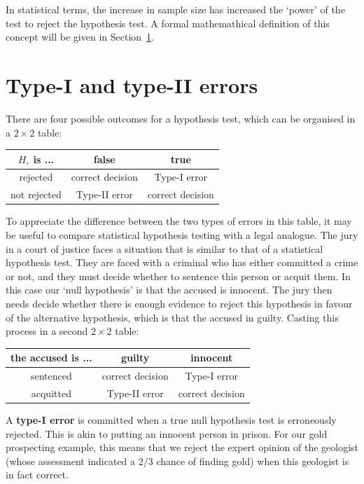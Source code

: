 In statistical terms, the increase in sample size has increased the
`power' of the test to reject the hypothesis test. A formal
mathemathical definition of this concept will be given in
Section~\ref{sec:typeI&II}.

\section{Type-I and type-II errors}
\label{sec:typeI&II}

There are four possible outcomes for a hypothesis test, which can be
organised in a ${2}\times{2}$ table:

\begin{center}
\begin{tabular}{c|cc}
  $H_\circ$ is ... & false & true \\ \hline
  rejected & correct decision & Type-I error \\
  not rejected & Type-II error & correct decision
\end{tabular}
\end{center}

To appreciate the difference between the two types of errors in this
table, it may be useful to compare statistical hypothesis testing with
a legal analogue. The jury in a court of justice faces a situation
that is similar to that of a statistical hypothesis test. They are
faced with a criminal who has either committed a crime or not, and
they must decide whether to sentence this person or acquit them.  In
this case our `null hypothesis' is that the accused is innocent.  The
jury then needs decide whether there is enough evidence to reject this
hypothesis in favour of the alternative hypothesis, which is that the
accused in guilty. Casting this process in a second ${2}\times{2}$
table:

\begin{center}
\begin{tabular}{c|cc}
  the accused is ... & guilty & innocent \\ \hline
  sentenced & correct decision & Type-I error \\
  acquitted & Type-II error & correct decision
\end{tabular}
\end{center}

A \textbf{type-I error} is committed when a true null hypothesis test
is erroneously rejected. This is akin to putting an innocent person in
prison. For our gold prospecting example, this means that we reject
the expert opinion of the geologist (whose assessment indicated a 2/3
chance of finding gold) when this geologist is in fact correct.\\

